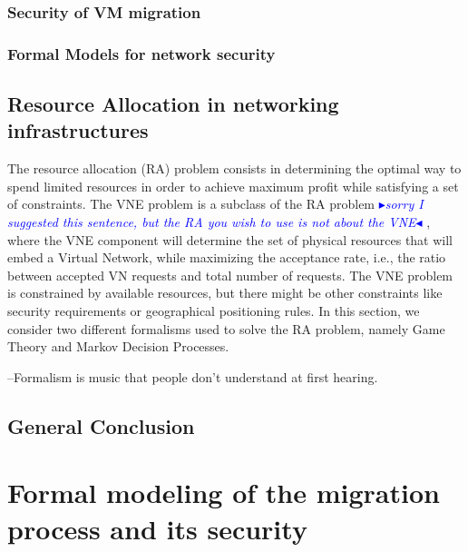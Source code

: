 \documentclass[a4paper, 11pt]{report}
\newcommand{\boxedtext}[1]{\fbox{\scriptsize\bfseries\textsf{#1}}}
\newcommand{\myremark}[2]{
   \textcolor{blue}{\boxedtext{#1}
      {\small$\blacktriangleright$\emph{\textsl{#2}}$\blacktriangleleft$}
}}
\newcommand\GB[1]{\myremark{GB}{#1}}
\newcommand{\ie}{i.e.,\xspace}
\theoremstyle{definition}
\begin{document}
\subsection{Security of VM migration}



\subsection{Formal Models for network security}



\section{Resource Allocation in networking infrastructures}
The resource allocation (RA) problem consists in determining the optimal way to spend limited resources in order to achieve maximum profit while satisfying a set of constraints.
The VNE problem is a subclass of the RA problem\GB{sorry I suggested this sentence, but the RA you wish to use is not about the VNE}, where the VNE component will determine the set of physical resources that will embed a Virtual Network, while maximizing the acceptance rate, \ie the ratio between accepted VN requests and total number of requests.
The VNE problem is constrained by available resources, but there might be other constraints like security requirements or geographical positioning rules.
In this section, we consider two different formalisms used to solve the RA problem, namely Game Theory and Markov Decision Processes. 

% 



\begin{savequote}

--Formalism is music that people don’t understand at first hearing.
\end{savequote}
\section{General Conclusion}


\newpage
\chapter{Formal modeling of the migration process and its security}
\label{sec:formal_model}

\end{document}
